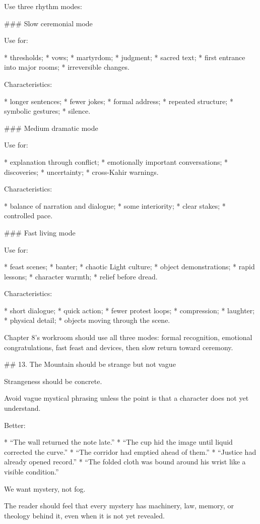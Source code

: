 Use three rhythm modes:

### Slow ceremonial mode

Use for:

* thresholds;
* vows;
* martyrdom;
* judgment;
* sacred text;
* first entrance into major rooms;
* irreversible changes.

Characteristics:

* longer sentences;
* fewer jokes;
* formal address;
* repeated structure;
* symbolic gestures;
* silence.

### Medium dramatic mode

Use for:

* explanation through conflict;
* emotionally important conversations;
* discoveries;
* uncertainty;
* cross-Kahir warnings.

Characteristics:

* balance of narration and dialogue;
* some interiority;
* clear stakes;
* controlled pace.

### Fast living mode

Use for:

* feast scenes;
* banter;
* chaotic Light culture;
* object demonstrations;
* rapid lessons;
* character warmth;
* relief before dread.

Characteristics:

* short dialogue;
* quick action;
* fewer protest loops;
* compression;
* laughter;
* physical detail;
* objects moving through the scene.

Chapter 8’s workroom should use all three modes:
formal recognition, emotional congratulations, fast feast and devices, then slow return toward ceremony.

## 13. The Mountain should be strange but not vague

Strangeness should be concrete.

Avoid vague mystical phrasing unless the point is that a character does not yet understand.

Better:

* “The wall returned the note late.”
* “The cup hid the image until liquid corrected the curve.”
* “The corridor had emptied ahead of them.”
* “Justice had already opened record.”
* “The folded cloth was bound around his wrist like a visible condition.”

We want mystery, not fog.

The reader should feel that every mystery has machinery, law, memory, or theology behind it, even when it is not yet revealed.

